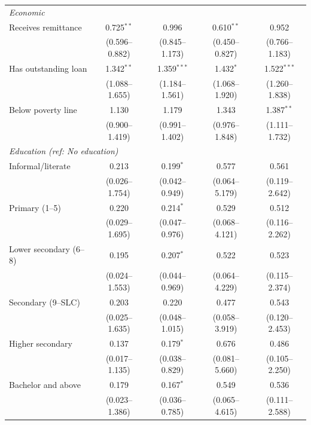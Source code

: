 \begin{table}[htbp]
\begin{tabular}{lcccc}
\multicolumn{5}{l}{\textit{Economic}} \\
\quad Receives remittance & 0.725$^{**}$ & 0.996 & 0.610$^{**}$ & 0.952 \\
\quad & (0.596--0.882) & (0.845--1.173) & (0.450--0.827) & (0.766--1.183) \\
\quad Has outstanding loan & 1.342$^{**}$ & 1.359$^{***}$ & 1.432$^{*}$ & 1.522$^{***}$ \\
\quad & (1.088--1.655) & (1.184--1.561) & (1.068--1.920) & (1.260--1.838) \\
\quad Below poverty line & 1.130 & 1.179 & 1.343 & 1.387$^{**}$ \\
\quad & (0.900--1.419) & (0.991--1.402) & (0.976--1.848) & (1.111--1.732) \\

\multicolumn{5}{l}{\textit{Education (ref: No education)}} \\
\quad Informal/literate & 0.213 & 0.199$^{*}$ & 0.577 & 0.561 \\
\quad & (0.026--1.754) & (0.042--0.949) & (0.064--5.179) & (0.119--2.642) \\
\quad Primary (1--5) & 0.220 & 0.214$^{*}$ & 0.529 & 0.512 \\
\quad & (0.029--1.695) & (0.047--0.976) & (0.068--4.121) & (0.116--2.262) \\
\quad Lower secondary (6--8) & 0.195 & 0.207$^{*}$ & 0.522 & 0.523 \\
\quad & (0.024--1.553) & (0.044--0.969) & (0.064--4.229) & (0.115--2.374) \\
\quad Secondary (9--SLC) & 0.203 & 0.220 & 0.477 & 0.543 \\
\quad & (0.025--1.635) & (0.048--1.015) & (0.058--3.919) & (0.120--2.453) \\
\quad Higher secondary & 0.137 & 0.179$^{*}$ & 0.676 & 0.486 \\
\quad & (0.017--1.135) & (0.038--0.829) & (0.081--5.660) & (0.105--2.250) \\
\quad Bachelor and above & 0.179 & 0.167$^{*}$ & 0.549 & 0.536 \\
\quad & (0.023--1.386) & (0.036--0.785) & (0.065--4.615) & (0.111--2.588) \\


\end{tabular}
\end{table}
